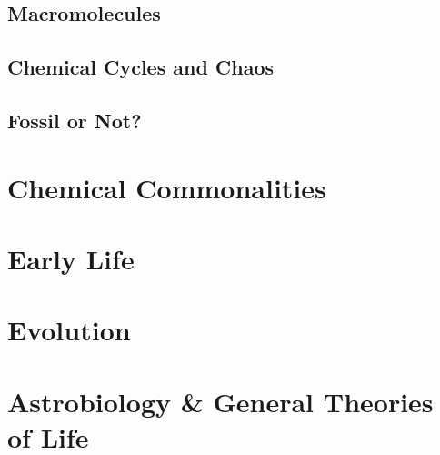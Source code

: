 \documentclass[]{article}
\begin{document}
\subsection{Macromolecules}
\subsection{Chemical Cycles and Chaos}
\subsection{Fossil or Not?}

\section{Chemical Commonalities}

\section{Early Life}

\section{Evolution}

\section{Astrobiology \& General Theories of Life}



\end{document}
